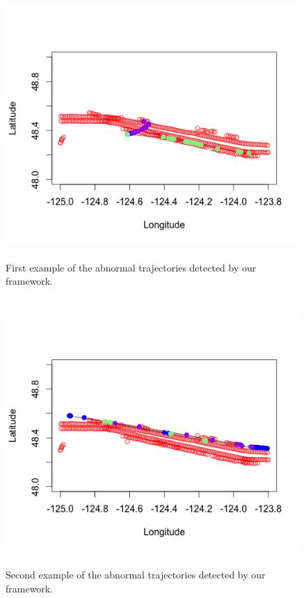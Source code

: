 \documentclass[12pt,glossary]{dalcsthesis}
\begin{document}

\begin{figure}[!hp]
\centering
\includegraphics[width=4.7in, height=4in]{p1.png}
\caption{First example of the abnormal trajectories detected by our framework.}
\label{fig:anomalydetection_tra1}
\end{figure}

\begin{figure}[!hp]
\centering
\includegraphics[width=4.7in, height=4in]{p2.png}
\caption{Second example of the abnormal trajectories detected by our framework.}
\label{fig:anomalydetection_tra2}
\end{figure}
\end{document}
